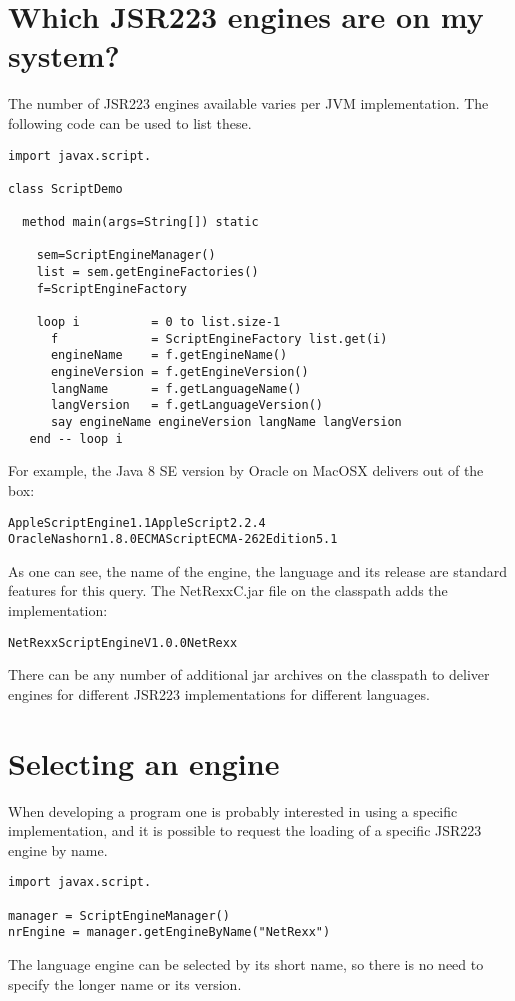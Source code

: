 \section{Which JSR223 engines are on my system?}
The number of JSR223 engines available varies per JVM implementation. The following code can be used to list these.
\begin{lstlisting}[label=enumeratejsr223,caption=Enumerate the JSR223 Engines on a JVM]
import javax.script.

class ScriptDemo
  
  method main(args=String[]) static
    
    sem=ScriptEngineManager()
    list = sem.getEngineFactories()
    f=ScriptEngineFactory
    
    loop i          = 0 to list.size-1
      f             = ScriptEngineFactory list.get(i)
      engineName    = f.getEngineName()
      engineVersion = f.getEngineVersion()
      langName      = f.getLanguageName()
      langVersion   = f.getLanguageVersion()
      say engineName engineVersion langName langVersion
   end -- loop i

\end{lstlisting}
For example, the Java 8 SE version by Oracle on MacOSX delivers out of the box:
\begin{alltt}
AppleScriptEngine 1.1 AppleScript 2.2.4
Oracle Nashorn 1.8.0  ECMAScript ECMA - 262 Edition 5.1
\end{alltt}
As one can see, the name of the engine, the language and its release are standard features for this query. The NetRexxC.jar file on the classpath adds the \nr{} implementation:
\begin{alltt}
NetRexx Script Engine V1.0.0 NetRexx 
\end{alltt}
There can be any number of additional jar archives on the classpath to deliver engines for different JSR223 implementations for different languages.
\section{Selecting an engine}
When developing a program one is probably interested in using a specific implementation, and it is possible to request the loading of a specific JSR223 engine by name.
\begin{lstlisting}[label=choosingjsr223,caption=Choosing an engine]
import javax.script.

manager = ScriptEngineManager()
nrEngine = manager.getEngineByName("NetRexx")
\end{lstlisting}
The language engine can be selected by its short name, so there is no need to specify the longer name or its version.
